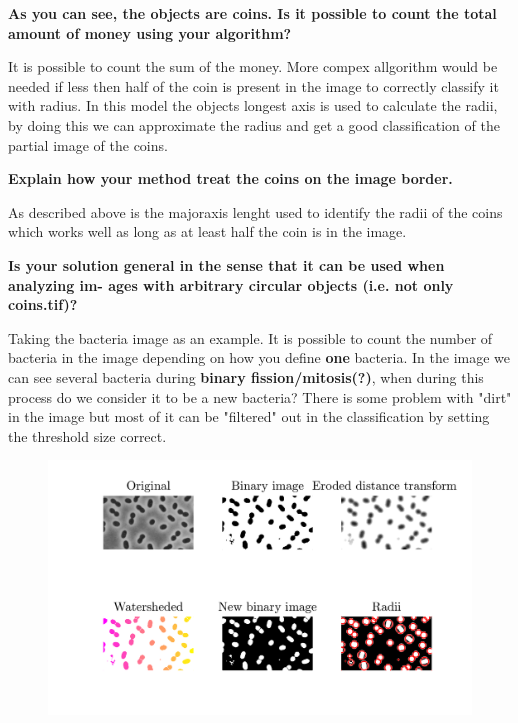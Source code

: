 \documentclass[oneside,a4paper]{article}
\begin{document}
\noindent \textbf{As you can see, the objects are coins. Is it possible to count the total amount
of money using your algorithm?}

It is possible to count the sum of the money. More compex allgorithm would be needed if less then half of the coin is present in the image to correctly classify it with radius. In this model the objects longest axis is used to calculate the radii, by doing this we can approximate the radius and get a good classification of the partial image of the coins. 


\noindent \textbf{Explain how your method treat the coins on the image border.}

As described above is the majoraxis lenght used to identify the radii of the coins which works well as long as at least half the coin is in the image. 



\noindent \textbf{Is your solution general in the sense that it can be used when analyzing im-
ages with arbitrary circular objects (i.e. not only coins.tif)?}

Taking the bacteria image as an example. It is possible to count the number of bacteria in the image depending on how you define \textbf{one} bacteria. In the image we can see several bacteria during \textbf{binary fission/mitosis(?)}, when during this process do we consider it to be a new bacteria? There is some problem with "dirt" in the image but most of it can be "filtered" out in the classification by setting the threshold size correct.  

\begin{figure}[ht!]
\centering
\includegraphics[width=130mm]{figures/assign_3c.png}
\caption{}
\label{fig:workprocessbac}
\end{figure}
\end{document}
